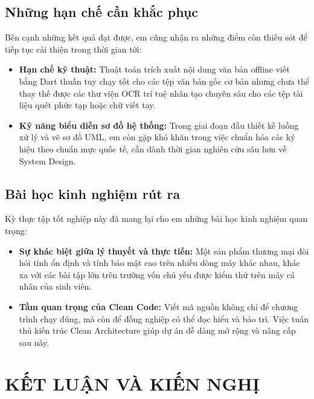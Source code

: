\documentclass[12pt, a4paper]{article}
\begin{document}
\subsection{Những hạn chế cần khắc phục}
Bên cạnh những kết quả đạt được, em cũng nhận ra những điểm còn thiếu sót để tiếp tục cải thiện trong thời gian tới:
\begin{itemize}
    \item \textbf{Hạn chế kỹ thuật:} Thuật toán trích xuất nội dung văn bản offline viết bằng Dart thuần tuy chạy tốt cho các tệp văn bản gốc cơ bản nhưng chưa thể thay thế được các thư viện OCR trí tuệ nhân tạo chuyên sâu cho các tệp tài liệu quét phức tạp hoặc chữ viết tay.
    \item \textbf{Kỹ năng biểu diễn sơ đồ hệ thống:} Trong giai đoạn đầu thiết kế luồng xử lý và vẽ sơ đồ UML, em còn gặp khó khăn trong việc chuẩn hóa các ký hiệu theo chuẩn mực quốc tế, cần dành thời gian nghiên cứu sâu hơn về System Design.
\end{itemize}

\subsection{Bài học kinh nghiệm rút ra}
Kỳ thực tập tốt nghiệp này đã mang lại cho em những bài học kinh nghiệm quan trọng:
\begin{itemize}
    \item \textbf{Sự khác biệt giữa lý thuyết và thực tiễn:} Một sản phẩm thương mại đòi hỏi tính ổn định và tính bảo mật cao trên nhiều dòng máy khác nhau, khác xa với các bài tập lớn trên trường vốn chủ yếu được kiểm thử trên máy cá nhân của sinh viên.
    \item \textbf{Tầm quan trọng của Clean Code:} Viết mã nguồn không chỉ để chương trình chạy đúng, mà còn để đồng nghiệp có thể đọc hiểu và bảo trì. Việc tuân thủ kiến trúc Clean Architecture giúp dự án dễ dàng mở rộng và nâng cấp sau này.
\end{itemize}

\section{KẾT LUẬN VÀ KIẾN NGHỊ}
\end{document}
